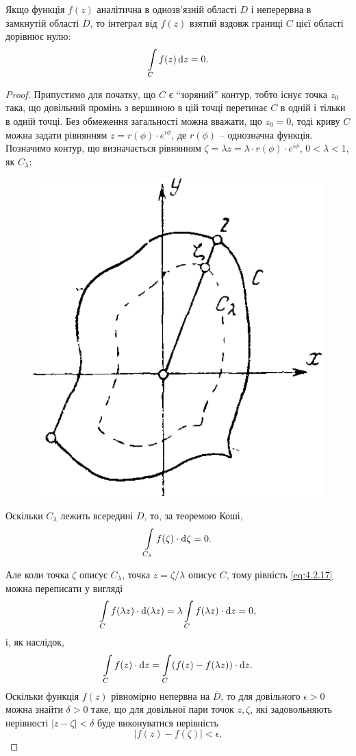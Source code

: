\begin{theorem}
	\label{th:4.2.5}
	Якщо функція $f(z)$ аналітична в однозв'язній області $D$ і неперервна в замкнутій області $\overline{D}$, то інтеграл від $f(z)$ взятий вздовж границі $C$ цієї області дорівнює нулю:
	\begin{equation}
		\label{eq:4.2.16}
		\displaystyle\int\limits_C f(z) \mathop{}\!\mathrm{d} z = 0.
	\end{equation}
\end{theorem}
\begin{proof}
	Припустимо для початку, що $C$ є ``зоряний'' контур, тобто існує точка $z_0$ така, що довільний промінь з вершиною в цій точці перетинає $C$ в одній і тільки в одній точці. Без обмеження загальності можна вважати, що $z_0 = 0$, тоді криву $C$ можна задати рівнянням $z = r(\phi) \cdot e^{i \phi}$, де $r(\phi)$ -- однозначна функція. \\

	Позначимо контур, що визначається рівнянням $\zeta = \lambda z = \lambda \cdot r(\phi) \cdot e^{i \phi}$, $0 < \lambda < 1$, як $C_\lambda$:
	\begin{figure}[H]
		\centering
		\includegraphics[width=.4\linewidth]{mal-19.png}
	\end{figure}

	Оскільки $C_\lambda$ лежить всередині $D$, то, за теоремою Коші,
	\begin{equation}
		\label{eq:4.2.17}
		\displaystyle\int\limits_{C_\lambda} f(\zeta) \cdot \mathop{}\!\mathrm{d} \zeta = 0.
	\end{equation}

	Але коли точка $\zeta$ описує $C_\lambda$, точка $z = \zeta / \lambda$ описує $C$, тому рівність \eqref{eq:4.2.17} можна переписати у вигляді
	\begin{equation}
		\label{eq:4.2.18}
		\displaystyle\int\limits_C f(\lambda z) \cdot \mathop{}\!\mathrm{d} (\lambda z) = \lambda \displaystyle\int\limits_C f(\lambda z) \cdot \mathop{}\!\mathrm{d} z = 0,
	\end{equation}
	і, як наслідок,
	\begin{equation}
		\label{eq:4.2.19}
		\displaystyle\int\limits_C f(z) \cdot \mathop{}\!\mathrm{d} z = \displaystyle\int\limits_C (f(z) - f(\lambda z)) \cdot \mathop{}\!\mathrm{d} z.
	\end{equation}
	Оскільки функція $f(z)$ рівномірно непервна на $\bar D$, то для довільного $\epsilon > 0$ можна знайти $\delta > 0$ таке, що для довільної пари точок $z, \zeta$, які задовольняють нерівності $|z-\zeta|<\delta$ буде виконуватися нерівність 
	\begin{equation}
		\label{eq:4.2.20}
		|f(z) - f(\zeta)| < \epsilon.
	\end{equation}


\end{proof}
